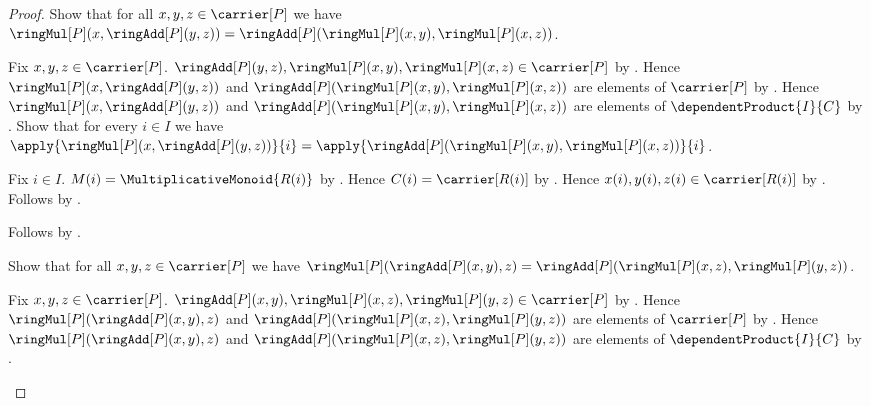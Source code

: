 \begin{proof}
    Show that for all $x,y,z\in\carrier[P]$ we have
        $\ringMul[P](x,\ringAdd[P](y,z))
            =\ringAdd[P](\ringMul[P](x,y),\ringMul[P](x,z))$.
    \begin{subproof}
        Fix $x,y,z\in\carrier[P]$.
        $\ringAdd[P](y,z),\ringMul[P](x,y),\ringMul[P](x,z)
            \in\carrier[P]$ by
            .
        Hence
            $\ringMul[P](x,\ringAdd[P](y,z))$ and
            $\ringAdd[P](\ringMul[P](x,y),\ringMul[P](x,z))$
                are elements of $\carrier[P]$ by
            .
        Hence
            $\ringMul[P](x,\ringAdd[P](y,z))$ and
            $\ringAdd[P](\ringMul[P](x,y),\ringMul[P](x,z))$
                are elements of $\dependentProduct{I}{C}$ by
            \auto.
        Show that for every $i\in I$ we have
            $\apply{\ringMul[P](x,\ringAdd[P](y,z))}{i}
                =\apply{\ringAdd[P](
                    \ringMul[P](x,y),\ringMul[P](x,z))}{i}$.
        \begin{subproof}
            Fix $i\in I$.
            $M(i)=\MultiplicativeMonoid{R(i)}$ by \auto.
            Hence $C(i)=\carrier[R(i)]$ by
                .
            Hence $x(i),y(i),z(i)\in\carrier[R(i)]$ by
                .
            Follows by
                .
        \end{subproof}
        Follows by .
    \end{subproof}
    Show that for all $x,y,z\in\carrier[P]$ we have
        $\ringMul[P](\ringAdd[P](x,y),z)
            =\ringAdd[P](\ringMul[P](x,z),\ringMul[P](y,z))$.
    \begin{subproof}
        Fix $x,y,z\in\carrier[P]$.
        $\ringAdd[P](x,y),\ringMul[P](x,z),\ringMul[P](y,z)
            \in\carrier[P]$ by
            .
        Hence
            $\ringMul[P](\ringAdd[P](x,y),z)$ and
            $\ringAdd[P](\ringMul[P](x,z),\ringMul[P](y,z))$
                are elements of $\carrier[P]$ by
            .
        Hence
            $\ringMul[P](\ringAdd[P](x,y),z)$ and
            $\ringAdd[P](\ringMul[P](x,z),\ringMul[P](y,z))$
                are elements of $\dependentProduct{I}{C}$ by
            \auto.

\end{subproof}
\end{proof}
